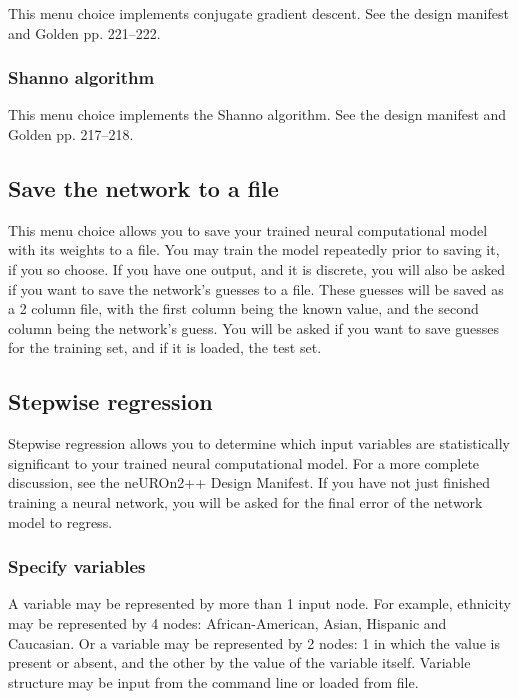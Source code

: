 This menu choice implements conjugate gradient descent.  See the
design manifest and Golden pp. 221--222.

\subsubsection{Shanno algorithm}

This menu choice implements the Shanno algorithm.  See the design
manifest and Golden pp. 217--218.

\subsection{Save the network to a file}

This menu choice allows you to save your trained neural computational
model with its weights to a file.  You may train the model repeatedly
prior to saving it, if you so choose.  If you have one output, and it
is discrete, you will also be asked if you want to save the network's
guesses to a file. These guesses will be saved as a 2 column file,
with the first column being the known value, and the second column
being the network's guess. You will be asked if you want to save
guesses for the training set, and if it is loaded, the test set.

\subsection{Stepwise regression}\label{stepregress}

Stepwise regression allows you to determine which input variables are
statistically significant to your trained neural computational model.
For a more complete discussion, see the neUROn2++ Design Manifest.
If you have not just finished training a neural network, you will be
asked for the final error of the network model to regress.

\subsubsection{Specify variables}

A variable may be represented by more than 1 input node.  For example,
ethnicity may be represented by 4 nodes: African-American, Asian,
Hispanic and Caucasian.  Or a variable may be represented by 2 nodes:
1 in which the value is present or absent, and the other by the value
of the variable itself.  Variable structure may be input from the
command line or loaded from file.

